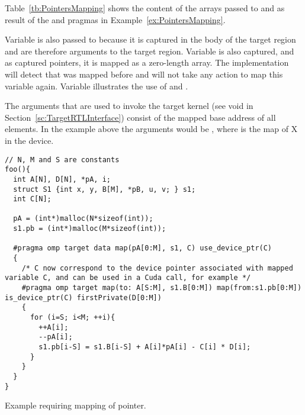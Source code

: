 Table~\ref{tb:PointersMapping} shows the content of the arrays passed to  and  as result of the \dtargetdata{} and \dtarget{} pragmas in Example~\ref{ex:PointersMapping}.

Variable  is also passed to  because it is captured in the body of the target region and are therefore arguments to the target region. Variable  is also captured, and as captured pointers, it is mapped as a zero-length array. The \libomptarget{} implementation will detect that  was mapped before and will not take any action to map this variable again. Variable  illustrates the use of  and .

The arguments that are used to invoke the target kernel (see void  in Section~\ref{sc:TargetRTLInterface}) consist of the mapped base address of all elements. In the example above the arguments would be , where  is the map of {X} in the device.

\begin{example}
\lstset{basicstyle=\scriptsize,frame=single}
\begin{lstlisting}
// N, M and S are constants
foo(){
  int A[N], D[N], *pA, i;
  struct S1 {int x, y, B[M], *pB, u, v; } s1;
  int C[N];
  
  pA = (int*)malloc(N*sizeof(int)); 
  s1.pb = (int*)malloc(M*sizeof(int)); 

  #pragma omp target data map(pA[0:M], s1, C) use_device_ptr(C)
  { 
    /* C now correspond to the device pointer associated with mapped variable C, and can be used in a Cuda call, for example */
    #pragma omp target map(to: A[S:M], s1.B[0:M]) map(from:s1.pb[0:M]) is_device_ptr(C) firstPrivate(D[0:M])
    {
      for (i=S; i<M; ++i){ 
        ++A[i]; 
        --pA[i]; 
        s1.pb[i-S] = s1.B[i-S] + A[i]*pA[i] - C[i] * D[i]; 
      }
    }
  }
}
\end{lstlisting}
\lstset{basicstyle=\small\bfseries,frame=none}
\caption{Example requiring mapping of pointer.}
\label{ex:PointersMapping}
\end{example}

